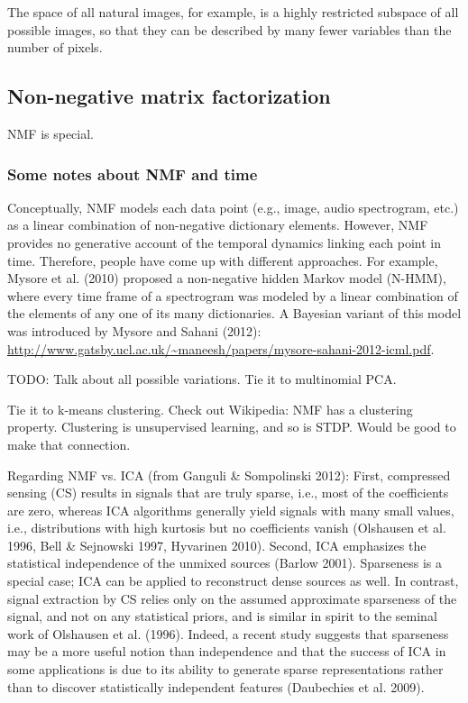 The space of all natural images, for example, is a highly restricted subspace of
all possible images, so that they can be described by many fewer variables than
the number of pixels.


\subsection{Non-negative matrix factorization}
\label{sec:ldr|nmf}

\ac{NMF}  is special.

\subsubsection{Some notes about NMF and time}
Conceptually, \ac{NMF} models each data point (e.g., image, audio spectrogram, etc.)
as a linear combination of non-negative
dictionary elements.
However, \ac{NMF} provides no generative account of the temporal dynamics linking
each point in time.
Therefore, people have come up with different approaches.
For example, Mysore et al. (2010) proposed a non-negative hidden Markov model (N-HMM),
where every time frame of a spectrogram was modeled by a linear combination
of the elements of any one of its many dictionaries.
A Bayesian variant of this model was introduced by Mysore and Sahani (2012):
\url{http://www.gatsby.ucl.ac.uk/~maneesh/papers/mysore-sahani-2012-icml.pdf}.





TODO: Talk about all possible variations. Tie it to multinomial \ac{PCA}.

Tie it to k-means clustering.
Check out Wikipedia: NMF has a clustering property.
Clustering is unsupervised learning, and so is STDP. Would be good to make that connection.


Regarding \ac{NMF} vs. \ac{ICA} (from Ganguli \& Sompolinski 2012): First, compressed sensing (CS)
results in signals that are truly sparse, i.e., most of the coefficients are zero,
whereas ICA algorithms generally yield signals with many small values, 
i.e., distributions with high kurtosis but no coefficients vanish
(Olshausen et al. 1996, Bell \& Sejnowski 1997, Hyvarinen 2010).
Second, ICA emphasizes the statistical independence of the unmixed sources (Barlow 2001).
Sparseness is a special case; ICA can be applied to reconstruct dense sources as well.
In contrast, signal extraction by CS relies only on the assumed approximate sparseness of the signal,
and not on any statistical priors, and is similar in spirit to the seminal work of
Olshausen et al. (1996).
Indeed, a recent study suggests that sparseness may be a more useful notion than independence
and that the success of ICA in some applications is due to its ability
to generate sparse representations rather than to
discover statistically independent features (Daubechies et al. 2009).

